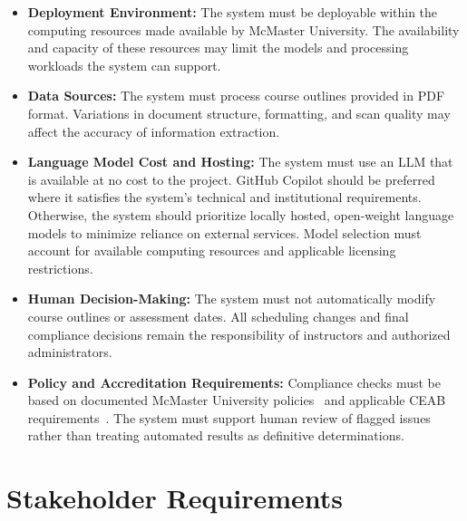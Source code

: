 \documentclass[12pt]{article}
\begin{document}
\begin{itemize}
    \item \textbf{Deployment Environment:} The system must be deployable within 
    the computing resources made available by McMaster University. The availability and 
    capacity of these resources may limit the models and processing workloads the system can support.

    \item \textbf{Data Sources:} The system must process course outlines provided in PDF format. 
    Variations in document structure, formatting, and scan quality may affect the accuracy of 
    information extraction.

    \item \textbf{Language Model Cost and Hosting:} The system must use an LLM that is
    available at no cost to the project. GitHub Copilot should be preferred where it
    satisfies the system's technical and institutional requirements. Otherwise, the
    system should prioritize locally hosted, open-weight language models to minimize
    reliance on external services. Model selection must account for available computing
    resources and applicable licensing restrictions.

    \item \textbf{Human Decision-Making:} The system must not automatically modify course outlines or 
    assessment dates. All scheduling changes and final compliance decisions remain the responsibility 
    of instructors and authorized administrators.

    \item \textbf{Policy and Accreditation Requirements:} Compliance checks must be based on documented 
    McMaster University policies~\citep{McMasterUCMP2025} and applicable CEAB requirements~\citep{CEAB2025}. The system must support human review 
    of flagged issues rather than treating automated results as definitive determinations.
\end{itemize}


\section{Stakeholder Requirements}

\end{document}
